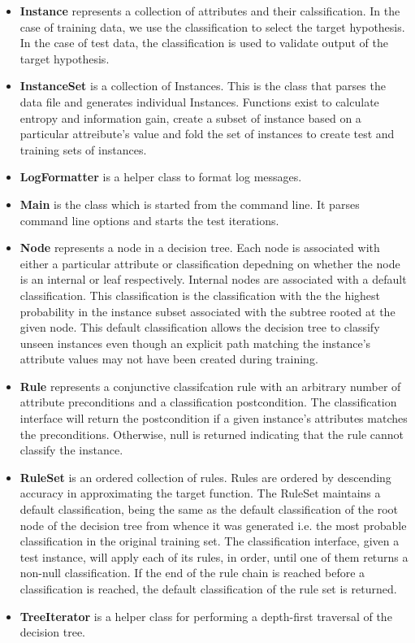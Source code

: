\documentclass[10pt]{report}
\begin{document}
\begin{itemize}
\item \textbf{Instance} represents a collection of attributes and
  their calssification. In the case of training data, we use the
  classification to select the target hypothesis. In the case of test
  data, the classification is used to validate output of the target
  hypothesis.

\item \textbf{InstanceSet} is a collection of Instances. This is the
  class that parses the data file and generates individual
  Instances. Functions exist to calculate entropy and information
  gain, create a subset of instance based on a particular attreibute's
  value and fold the set of instances to create test and training sets
  of instances.

\item \textbf{LogFormatter} is a helper class to format log messages.

\item \textbf{Main} is the class which is started from the command
  line. It parses command line options and starts the test iterations.

\item \textbf{Node} represents a node in a decision tree. Each node is
  associated with either a particular attribute or classification
  depedning on whether the node is an internal or leaf
  respectively. Internal nodes are associated with a default
  classification. This classification is the classification with the
  the highest probability in the instance subset associated with the
  subtree rooted at the given node. This default classification allows
  the decision tree to classify unseen instances even though an explicit
  path matching the instance's attribute values may not have been
  created during training. 

\item \textbf{Rule} represents a conjunctive classifcation rule with
  an arbitrary number of attribute preconditions and a classification
  postcondition. The classification interface will return the
  postcondition if a given instance's attributes matches the
  preconditions. Otherwise, null is returned indicating that the rule
  cannot classify the instance.

\item \textbf{RuleSet} is an ordered collection of rules. Rules are
  ordered by descending accuracy in approximating the target
  function. The RuleSet maintains a default classification, being the
  same as the default classification of the root node of the decision
  tree from whence it was generated i.e. the most probable
  classification in the original training set. The classification
  interface, given a test instance, will apply each of 
  its rules, in order, until one of them returns a non-null
  classification. If the end of the rule chain is reached before a
  classification is reached, the default classification of the rule
  set is returned.

\item \textbf{TreeIterator} is a helper class for performing a
  depth-first traversal of the decision tree.

\end{itemize}
\end{document}
